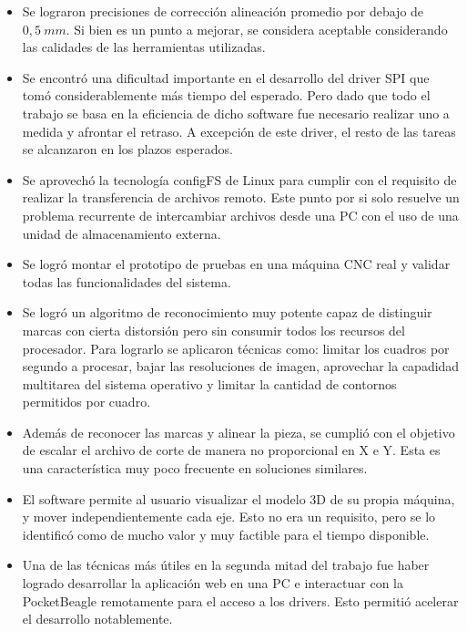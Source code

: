 \begin{itemize}
   \item{Se lograron precisiones de corrección alineación promedio por debajo de $0,5\:mm$. Si bien es un punto a mejorar, se considera aceptable considerando las calidades de las herramientas utilizadas.}

   \item{Se encontró una dificultad importante en el desarrollo del driver SPI que tomó considerablemente más tiempo del esperado. Pero dado que todo el trabajo se basa en la eficiencia de dicho software fue necesario realizar uno a medida y afrontar el retraso. A excepción de este driver, el resto de las tareas se alcanzaron en los plazos esperados.}
   
   \item{Se aprovechó la tecnología configFS de Linux para cumplir con el requisito de realizar la transferencia de archivos remoto. Este punto por si solo resuelve un problema recurrente de intercambiar archivos desde una PC con el uso de una unidad de almacenamiento externa.}

   \item{Se logró montar el prototipo de pruebas en una máquina CNC real y validar todas las funcionalidades del sistema.}

   \item{Se logró un algoritmo de reconocimiento muy potente capaz de distinguir marcas con cierta distorsión pero sin consumir todos los recursos del procesador.  Para lograrlo se aplicaron técnicas como: limitar los cuadros por segundo a procesar, bajar las resoluciones de imagen, aprovechar la capadidad multitarea del sistema operativo y limitar la cantidad de contornos permitidos por cuadro.}

   \item{Además de reconocer las marcas y alinear la pieza, se cumplió con el objetivo de escalar el archivo de corte de manera no proporcional en X e Y. Esta es una característica muy poco frecuente en soluciones similares.}

   \item{El software permite al usuario visualizar el modelo 3D de su propia máquina, y mover independientemente cada eje. Esto no era un requisito, pero se lo identificó como de mucho valor y muy factible para el tiempo disponible.}

   \item{Una de las técnicas más útiles en la segunda mitad del trabajo fue haber logrado desarrollar la aplicación web en una PC e interactuar con la PocketBeagle remotamente para el acceso a los drivers. Esto permitió acelerar el desarrollo notablemente.}

\end{itemize}

